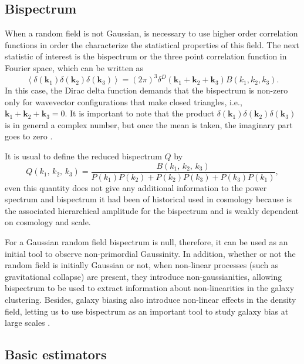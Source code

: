 \documentclass[a4paper,fleqn,usenatbib]{mnras}
\begin{document}
\subsection{Bispectrum}

When a random field is not Gaussian, is necessary to use higher order 
correlation functions in order the characterize the statistical properties 
of this field. The next statistic of interest is the bispectrum or the three 
point correlation function in Fourier space, which can be written as
\begin{equation}
  \left\langle \delta(\mathbf{k}_1) \delta(\mathbf{k}_2) \delta(\mathbf{k}_3) 
  \right\rangle = \left(2\pi\right)^3 
  \delta^D\left(\mathbf{k}_1+\mathbf{k}_2+\mathbf{k}_3\right) B(k_1,k_2,k_3).
\end{equation}
In this case, the Dirac delta function demands that the bispectrum is non-zero 
only for wavevector configurations that make closed triangles, i.e.,
$\mathbf{k}_1+\mathbf{k}_2+\mathbf{k}_3=0$. 
It is important to note that the product 
$\delta(\mathbf{k}_1)\delta(\mathbf{k}_2)\delta(\mathbf{k}_3)$ is in general
a complex number, but once the mean is taken, the imaginary part goes to zero 
\citep{GilMarin2012}. 

It is usual to define the reduced bispectrum $Q$ by
\begin{equation}
  Q(k_1,\, k_2,\, k_3)
  =\frac{B(k_1,\, k_2,\, k_3)}{P(k_1)P(k_2)+P(k_2)P(k_3)+P(k_3)P(k_1)},
\end{equation}
even this quantity does not give any additional information to the power 
spectrum and bispectrum it had been of historical used in cosmology because is 
the associated hierarchical amplitude for the bispectrum and is weakly 
dependent on cosmology and scale.

For a Gaussian random field bispectrum is null, therefore, it can be used as an 
initial tool to observe non-primordial Gaussinity. In addition, whether or 
not the random field is initially Gaussian or not, when non-linear processes 
(such as gravitational collapse) are present, they introduce non-gaussianities, 
allowing bispectrum to be used to extract information about non-linearities 
in the galaxy clustering. Besides, galaxy biasing also introduce non-linear 
effects in the density field, letting us to use bispectrum as an important tool 
to study galaxy bias at large scales \citep{Matarrese1997,GilMarin2015}.


\subsection{Basic estimators}
\end{document}
